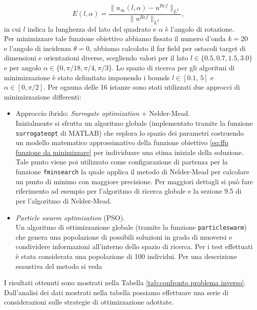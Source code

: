 \documentclass[a4paper,12pt]{article}
\theoremstyle{definition}
\begin{document}
\begin{equation}
	\label{eq:ffp funzione da minimizzare}
	E(l, \alpha) = \frac{\|u_\infty(l, \alpha) - u^{Ref}\|_{L^2}}{\|u^{Ref}\|_{L^2}},
\end{equation}
in cui $l$ indica la lunghezza del lato del quadrato e $\alpha$ è l'angolo di rotazione. \\
Per minimizzare tale funzione obiettivo abbiamo fissato il numero d'onda $k=20$ e l'angolo di incidenza $\theta = 0$, abbiamo calcolato il far field per ostacoli target di dimensioni e orientazioni diverse, scegliendo valori per il lato $l \in \{0.5, 0.7, 1.5, 3.0\}$ e per angolo $\alpha \in \{0, \pi/18, \pi/4, \pi/3\}$. Lo spazio di ricerca per gli algoritmi di minimizzazione è stato delimitato imponendo i bounds $l \in [0.1, \, 5]$ e $\alpha \in [0, \pi/2]$. Per ognuna delle 16 istanze sono stati utilizzati due approcci di minimizzazione differenti:
\begin{itemize}
	\item Approccio ibrido: \textit{Surrogate optimization} + Nelder-Mead. \\
	Inizialmente si sfrutta un algoritmo globale (implementato tramite la funzione \texttt{surrogateopt} di MATLAB) che esplora lo spazio dei parametri costruendo un modello matematico approssimativo della funzione obiettivo \ref{eq:ffp funzione da minimizzare} per individuare una stima iniziale della soluzione. Tale punto viene poi utilizzato come configurazione di partenza per la funzione \texttt{fminsearch} la quale applica il metodo di Nelder-Mead per calcolare un punto di minimo con maggiore precisione. Per maggiori dettagli si può fare riferimento ad esempio \cite{SurrOpt} per l'algoritmo di ricerca globale e la sezione 9.5 di \cite{NelderMead} per l'algoritmo di Nelder-Mead.
	\item \textit{Particle swarm optimization} (PSO).\\
	Un algoritmo di ottimizzazione globale (tramite la funzione \texttt{particleswarm}) che genera una popolazione di possibili soluzioni in grado di muoversi e condividere informazioni all'interno dello spazio di ricerca. Per i test effettuati è stata considerata una popolazione di 100 individui. Per una descrizione esaustiva del metodo si veda \cite{PSO}
\end{itemize}
I risultati ottenuti sono mostrati nella Tabella \ref{tab:confronto problema inverso}. Dall'analisi dei dati mostrati nella tabella possiamo effettuare una serie di considerazioni sulle strategie di ottimizzazione adottate. \\
\end{document}
